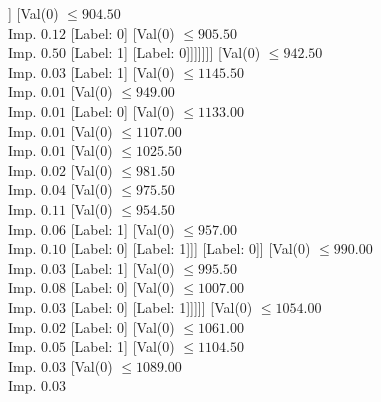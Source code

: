 \documentclass[margin=10pt]{standalone}
\begin{document}
\begin{forest}
												[Label: 0]
												[Val($0$) $ \leq 891.50$ \\ Imp. $0.11$
													[Label: 1]
													[Val($0$) $ \leq 894.50$ \\ Imp. $0.04$
														[Val($0$) $ \leq 893.00$ \\ Imp. $0.50$
															[Label: 0]
															[Label: 1]]
														[Val($0$) $ \leq 904.50$ \\ Imp. $0.12$
															[Label: 0]
															[Val($0$) $ \leq 905.50$ \\ Imp. $0.50$
																[Label: 1]
																[Label: 0]]]]]]]
										[Val($0$) $ \leq 942.50$ \\ Imp. $0.03$
											[Label: 1]
											[Val($0$) $ \leq 1145.50$ \\ Imp. $0.01$
												[Val($0$) $ \leq 949.00$ \\ Imp. $0.01$
													[Label: 0]
													[Val($0$) $ \leq 1133.00$ \\ Imp. $0.01$
														[Val($0$) $ \leq 1107.00$ \\ Imp. $0.01$
															[Val($0$) $ \leq 1025.50$ \\ Imp. $0.02$
																[Val($0$) $ \leq 981.50$ \\ Imp. $0.04$
																	[Val($0$) $ \leq 975.50$ \\ Imp. $0.11$
																		[Val($0$) $ \leq 954.50$ \\ Imp. $0.06$
																			[Label: 1]
																			[Val($0$) $ \leq 957.00$ \\ Imp. $0.10$
																				[Label: 0]
																				[Label: 1]]]
																		[Label: 0]]
																	[Val($0$) $ \leq 990.00$ \\ Imp. $0.03$
																		[Label: 1]
																		[Val($0$) $ \leq 995.50$ \\ Imp. $0.08$
																			[Label: 0]
																			[Val($0$) $ \leq 1007.00$ \\ Imp. $0.03$
																				[Label: 0]
																				[Label: 1]]]]]
																[Val($0$) $ \leq 1054.00$ \\ Imp. $0.02$
																	[Label: 0]
																	[Val($0$) $ \leq 1061.00$ \\ Imp. $0.05$
																		[Label: 1]
																		[Val($0$) $ \leq 1104.50$ \\ Imp. $0.03$
																			[Val($0$) $ \leq 1089.00$ \\ Imp. $0.03$

\end{forest}
\end{document}
